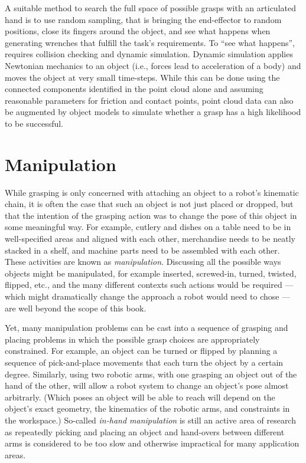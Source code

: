A suitable method to search the full space of possible grasps with an articulated hand is to use random sampling, that is bringing the end-effector to random positions, close its fingers around the object, and see what happens when generating wrenches that fulfill the task's requirements.
To ``see what happens'', requires collision checking and dynamic simulation. Dynamic simulation applies Newtonian mechanics to an object (i.e., forces lead to acceleration of a body) and moves the object at very small time-steps. While this can be done using the connected components identified in the point cloud alone and assuming reasonable parameters for friction and contact points, point cloud data can also be augmented by object models to simulate whether a grasp has a high likelihood to be successful. 

\section{Manipulation}\label{sec:manipulation}
While grasping is only concerned with attaching an object to a robot's kinematic chain, it is often the case that such an object is not just placed or dropped, but that the intention of the grasping action was to change the pose of this object in some meaningful way. For example, cutlery and dishes on a table need to be in well-specified areas and aligned with each other, merchandise needs to be neatly stacked in a shelf, and machine parts need to be assembled with each other. These activities are known as \emph{manipulation}. Discussing all the possible ways objects might be manipulated, for example inserted, screwed-in, turned, twisted, flipped, etc., and the many different contexts such actions would be required --- which might dramatically change the approach a robot would need to chose --- are well beyond the scope of this book.

Yet, many manipulation problems can be cast into a sequence of grasping and placing problems in which the possible grasp choices are appropriately constrained. For example, an object can be turned or flipped by planning a sequence of pick-and-place movements that each turn the object by a certain degree. Similarly, using two robotic arms, with one grasping an object out of the hand of the other, will allow a robot system to change an object's pose almost arbitrarly. (Which poses an object will be able to reach will depend on the object's exact geometry, the kinematics of the robotic arms, and constraints in the workspace.) So-called \emph{in-hand manipulation} is still an active area of research as  repeatedly picking and placing an object and hand-overs between different arms is considered to be too slow and otherwise impractical for many application areas.  

